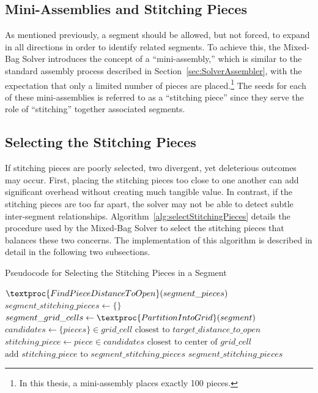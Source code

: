 \subsection{Mini-Assemblies and Stitching Pieces}

As mentioned previously, a segment should be allowed, but not forced, to expand in all directions in order to identify related segments.  To achieve this, the Mixed-Bag Solver introduces the concept of a ``mini-assembly,'' which is similar to the standard assembly process described in Section~\ref{sec:SolverAssembler}, with the expectation that only a limited number of pieces are placed.\footnote{In this thesis, a mini-assembly places exactly 100 pieces.}  The seeds for each of these mini-assemblies is referred to as a ``stitching piece'' since they serve the role of ``stitching'' together associated segments.

\subsection{Selecting the Stitching Pieces}\label{sec:stitchingPieceSelection}

If stitching pieces are poorly selected, two divergent, yet deleterious outcomes may occur.  First, placing the stitching pieces too close to one another can add significant overhead without creating much tangible value.  In contrast, if the stitching pieces are too far apart, the solver may not be able to detect subtle inter-segment relationships.  Algorithm~\ref{alg:selectStitchingPieces} details the procedure used by the Mixed-Bag Solver to select the stitching pieces that balances these two concerns.  The implementation of this algorithm is described in detail in the following two subsections.

\begin{algorithm}[tb]
\caption{Pseudocode for Selecting the Stitching Pieces in a Segment}
\label{alg:selectStitchingPieces}
\begin{algorithmic}[1]
	\State $\textproc{FindPieceDistanceToOpen}(segment\_pieces)$
	\State $segment\_stitching\_pieces \gets \{ \}$
    \State $segment\_grid\_cells \gets \textproc{PartitionIntoGrid}(segment)$
			\State $candidates \gets \{ pieces \} \in grid\_cell \text{ closest to } target\_distance\_to\_open$
			\State $stitching\_piece \gets piece \in candidates \text{ closest to center of } grid\_cell$
			\State $\text{add } stitching\_piece \text{ to } segment\_stitching\_pieces$
		\EndIf
	\EndFor
	\State \Return $segment\_stitching\_pieces$
\EndProcedure
\end{algorithmic}
\end{algorithm}


